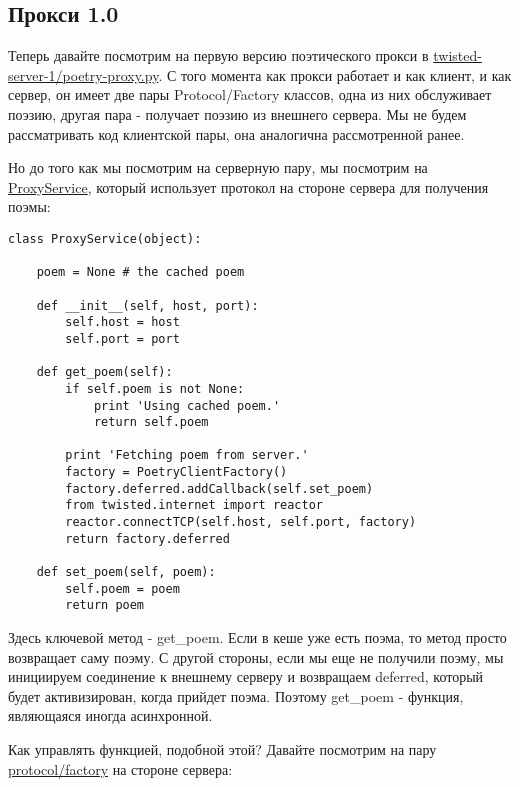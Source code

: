 \subsection{Прокси 1.0}

Теперь давайте посмотрим на первую версию 
поэтического прокси в 
\href{http://github.com/jdavisp3/twisted-intro/blob/master/twisted-server-1/poetry-proxy.py#L1}{twisted-server-1/poetry-proxy.py}. С того момента как 
прокси работает и как клиент, и как сервер, он имеет две 
пары Protocol/Factory классов, одна из них обслуживает 
поэзию, другая пара - получает поэзию из внешнего сервера. 
Мы не будем рассматривать код клиентской пары, она аналогична 
рассмотренной ранее.

Но до того как мы посмотрим на серверную пару, мы посмотрим 
на \href{http://github.com/jdavisp3/twisted-intro/blob/master/twisted-server-1/poetry-proxy.py#L100}{ProxyService}, который использует протокол на стороне 
сервера для получения поэмы:

 \begin{verbatim}
class ProxyService(object):

    poem = None # the cached poem

    def __init__(self, host, port):
        self.host = host
        self.port = port

    def get_poem(self):
        if self.poem is not None:
            print 'Using cached poem.'
            return self.poem

        print 'Fetching poem from server.'
        factory = PoetryClientFactory()
        factory.deferred.addCallback(self.set_poem)
        from twisted.internet import reactor
        reactor.connectTCP(self.host, self.port, factory)
        return factory.deferred

    def set_poem(self, poem):
        self.poem = poem
        return poem
\end{verbatim} 


Здесь ключевой метод - get\_poem. Если в кеше уже есть поэма, 
то метод просто возвращает саму поэму. С другой стороны, 
если мы еще не получили поэму, мы инициируем соединение 
к внешнему серверу и возвращаем deferred, который будет активизирован, 
когда прийдет поэма. Поэтому get\_poem - функция, являющаяся 
иногда асинхронной.

Как управлять функцией, подобной этой? Давайте посмотрим на пару 
\href{http://github.com/jdavisp3/twisted-intro/blob/master/twisted-server-1/poetry-proxy.py#L52}{protocol/factory} на стороне сервера:

